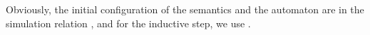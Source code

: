 \begin{isabellebody}
\begin{isamarkuptext}
\begin{theorem}\label{th:simulation_generated}
\mbox{}\newline 
{}
\end{theorem}

Obviously, the initial configuration of the semantics and the automaton are in
the simulation relation \isa{{\isasymapprox}}, and for the inductive step, we use
.\end{isamarkuptext}\isamarkuptrue \isadelimtheory
\endisadelimtheory
\isatagtheory
\endisatagtheory
{\isafoldtheory}\isadelimtheory
\endisadelimtheory
\end{isabellebody}